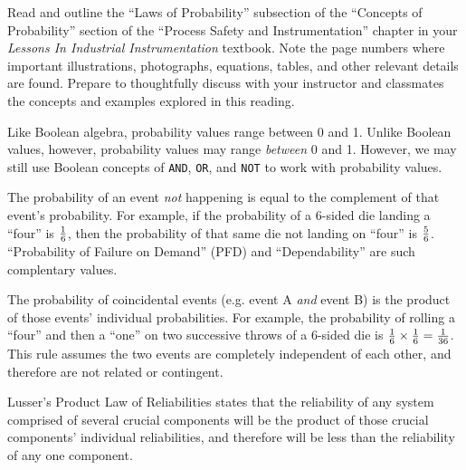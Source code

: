 

Read and outline the ``Laws of Probability'' subsection of the ``Concepts of Probability'' section of the ``Process Safety and Instrumentation'' chapter in your {\it Lessons In Industrial Instrumentation} textbook.  Note the page numbers where important illustrations, photographs, equations, tables, and other relevant details are found.  Prepare to thoughtfully discuss with your instructor and classmates the concepts and examples explored in this reading.














Like Boolean algebra, probability values range between 0 and 1.  Unlike Boolean values, however, probability values may range {\it between} 0 and 1.  However, we may still use Boolean concepts of {\tt AND}, {\tt OR}, and {\tt NOT} to work with probability values.

\vskip 10pt

The probability of an event {\it not} happening is equal to the complement of that event's probability.  For example, if the probability of a 6-sided die landing a ``four'' is $1 \over 6$, then the probability of that same die not landing on ``four'' is $5 \over 6$.  ``Probability of Failure on Demand'' (PFD) and ``Dependability'' are such complentary values.

\vskip 10pt

The probability of coincidental events (e.g. event A {\it and} event B) is the product of those events' individual probabilities.  For example, the probability of rolling a ``four'' and then a ``one'' on two successive throws of a 6-sided die is ${1 \over 6} \times {1 \over 6} = {1 \over 36}$.  This rule assumes the two events are completely independent of each other, and therefore are not related or contingent.

Lusser's Product Law of Reliabilities states that the reliability of any system comprised of several crucial components will be the product of those crucial components' individual reliabilities, and therefore will be less than the reliability of any one component. 

